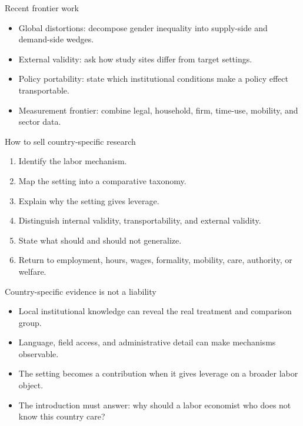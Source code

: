 \documentclass[aspectratio=169,11pt]{beamer}
\begin{document}
\begin{frame}{Recent frontier work}
\begin{itemize}
    \item Global distortions: decompose gender inequality into supply-side and demand-side wedges.
    \item External validity: ask how study sites differ from target settings.
    \item Policy portability: state which institutional conditions make a policy effect transportable.
    \item Measurement frontier: combine legal, household, firm, time-use, mobility, and sector data.
\end{itemize}
\end{frame}

\begin{frame}{How to sell country-specific research}
\begin{enumerate}
    \item Identify the labor mechanism.
    \item Map the setting into a comparative taxonomy.
    \item Explain why the setting gives leverage.
    \item Distinguish internal validity, transportability, and external validity.
    \item State what should and should not generalize.
    \item Return to employment, hours, wages, formality, mobility, care, authority, or welfare.
\end{enumerate}
\end{frame}

\begin{frame}{Country-specific evidence is not a liability}
\begin{itemize}
    \item Local institutional knowledge can reveal the real treatment and comparison group.
    \item Language, field access, and administrative detail can make mechanisms observable.
    \item The setting becomes a contribution when it gives leverage on a broader labor object.
    \item The introduction must answer: why should a labor economist who does not know this country care?
\end{itemize}
\end{frame}
\end{document}

